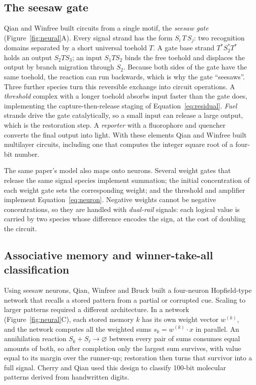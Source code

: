 \subsection{The seesaw gate}
Qian and Winfree built circuits from a single motif, the \emph{seesaw gate}
(Figure~\ref{fig:neural}A).\cite{QianWinfree2011} Every signal strand has the form
$S_i\,T\,S_j$: two recognition domains separated by a short universal toehold
$T$. A gate base strand $T^*S_2^*T^*$ holds an output $S_2TS_3$; an input
$S_1TS_2$ binds the free toehold and displaces the output by branch migration
through $S_2$. Because both sides of the gate have the same toehold, the reaction
can run backwards, which is why the gate ``seesaws''. Three further species turn
this reversible exchange into circuit operations. A \emph{threshold} complex with
a longer toehold absorbs input faster than the gate does, implementing the
capture-then-release staging of Equation~\eqref{eq:residual}. \emph{Fuel}
strands drive the gate catalytically, so a small input can release a large
output, which is the restoration step. A \emph{reporter} with a fluorophore and
quencher converts the final output into light. With these elements Qian and
Winfree built multilayer circuits, including one that computes the integer
square root of a four-bit number.\cite{QianWinfree2011}

The same paper's model also maps onto neurons. Several weight gates that release
the same signal species implement summation; the initial concentration of each
weight gate sets the corresponding weight; and the threshold and amplifier
implement Equation~\eqref{eq:neuron}. Negative weights cannot be negative
concentrations, so they are handled with \emph{dual-rail} signals: each logical
value is carried by two species whose difference encodes the sign, at the cost
of doubling the circuit.

\subsection{Associative memory and winner-take-all classification}
Using seesaw neurons, Qian, Winfree and Bruck built a four-neuron Hopfield-type
network that recalls a stored pattern from a partial or corrupted
cue.\cite{QianWinfreeBruck2011} Scaling to larger patterns required a different
architecture. In a  network (Figure~\ref{fig:neural}C), each
stored memory $k$ has its own weight vector $w^{(k)}$, and the network computes
all the weighted sums $s_k=w^{(k)}\cdot x$ in parallel. An annihilation reaction
$S_k+S_\ell\to\varnothing$ between every pair of sums consumes equal amounts of
both, so after completion only the largest sum survives, with value equal to its
margin over the runner-up; restoration then turns that survivor into a full
signal. Cherry and Qian used this design to classify 100-bit molecular patterns
derived from handwritten digits.\cite{CherryQian2018}

